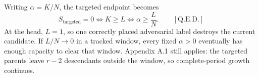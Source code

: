 Writing $\alpha=K/N$, the targeted endpoint becomes
\begin{equation*}
S_{\mathrm{targeted}}=0
\Longleftrightarrow
K\ge L
\Longleftrightarrow
\alpha\ge\frac LN.
\qquad[\text{Q.E.D.}]
\end{equation*}
At the head, $L=1$, so one correctly placed adversarial label destroys the current candidate. If $L/N\longrightarrow0$ in a tracked window, every fixed $\alpha>0$ eventually has enough capacity to clear that window. Appendix A.1 still applies: the targeted parents leave $r-2$ descendants outside the window, so complete-period growth continues.
